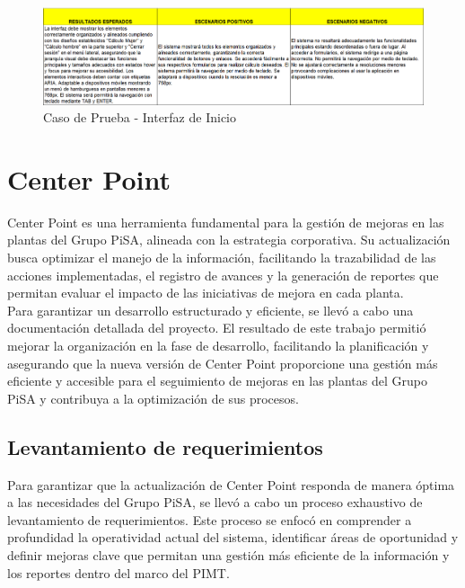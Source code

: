 \documentclass[12pt,letterpaper,spanish, xcolor=table]{report}
\numberwithin{figure}{subsection}
\begin{document}
	\begin{figure}[H]
		\centering
		\includegraphics[width=1.0\textwidth]
		{Imagenes/CalculadoraNutricional/CPInicio2.png}
		\caption{Caso de Prueba - Interfaz de Inicio
		}\label{a2}
	\end{figure}
	
	
\section{Center Point}

	Center Point es una herramienta fundamental para la gestión de mejoras en las plantas del Grupo PiSA, alineada con la estrategia corporativa. Su actualización busca optimizar el manejo de la información, facilitando la trazabilidad de las acciones implementadas, el registro de avances y la generación de reportes que permitan evaluar el impacto de las iniciativas de mejora en cada planta.\\
	
	Para garantizar un desarrollo estructurado y eficiente, se llevó a cabo una documentación detallada del proyecto. El resultado de este trabajo permitió mejorar la organización en la fase de desarrollo, facilitando la planificación y asegurando que la nueva versión de Center Point proporcione una gestión más eficiente y accesible para el seguimiento de mejoras en las plantas del Grupo PiSA y contribuya a la optimización de sus procesos.\\
	
	
\subsection{Levantamiento de requerimientos}
	
	Para garantizar que la actualización de Center Point responda de manera óptima a las necesidades del Grupo PiSA, se llevó a cabo un proceso exhaustivo de levantamiento de requerimientos. Este proceso se enfocó en comprender a profundidad la operatividad actual del sistema, identificar áreas de oportunidad y definir mejoras clave que permitan una gestión más eficiente de la información y los reportes dentro del marco del PIMT.\\
	
\end{document}
